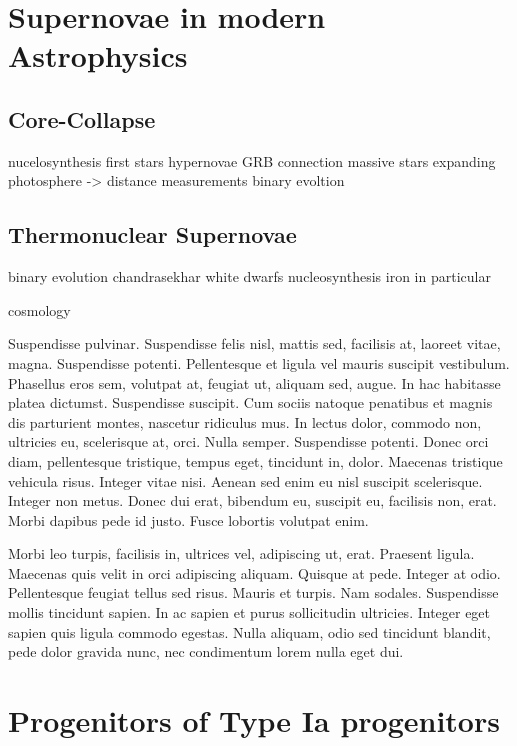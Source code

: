 \section{Supernovae in modern Astrophysics}
\label{sec:sn_modern_astro}
\subsection{Core-Collapse}
nucelosynthesis
first stars
hypernovae
GRB connection
massive stars
expanding photosphere -> distance measurements
binary evoltion

\subsection{Thermonuclear Supernovae}
binary evolution
chandrasekhar
white dwarfs
nucleosynthesis
iron in particular

cosmology


Suspendisse pulvinar. Suspendisse felis nisl, mattis sed, facilisis
at, laoreet vitae, magna. Suspendisse potenti. Pellentesque et ligula
vel mauris suscipit vestibulum. Phasellus eros sem, volutpat at,
feugiat ut, aliquam sed, augue. In hac habitasse platea
dictumst. Suspendisse suscipit. Cum sociis natoque penatibus et magnis
dis parturient montes, nascetur ridiculus mus. In lectus dolor,
commodo non, ultricies eu, scelerisque at, orci. Nulla
semper. Suspendisse potenti. Donec orci diam, pellentesque tristique,
tempus eget, tincidunt in, dolor. Maecenas tristique vehicula
risus. Integer vitae nisi. Aenean sed enim eu nisl suscipit
scelerisque. Integer non metus. Donec dui erat, bibendum eu, suscipit
eu, facilisis non, erat. Morbi dapibus pede id justo. Fusce lobortis
volutpat enim.

Morbi leo turpis, facilisis in, ultrices vel, adipiscing ut,
erat. Praesent ligula. Maecenas quis velit in orci adipiscing
aliquam. Quisque at pede. Integer at odio. Pellentesque feugiat tellus
sed risus. Mauris et turpis. Nam sodales. Suspendisse mollis tincidunt
sapien. In ac sapien et purus sollicitudin ultricies. Integer eget
sapien quis ligula commodo egestas. Nulla aliquam, odio sed tincidunt
blandit, pede dolor gravida nunc, nec condimentum lorem nulla eget
dui.  
\section{Progenitors of Type Ia progenitors}
\label{sec:snia_progenitor}


